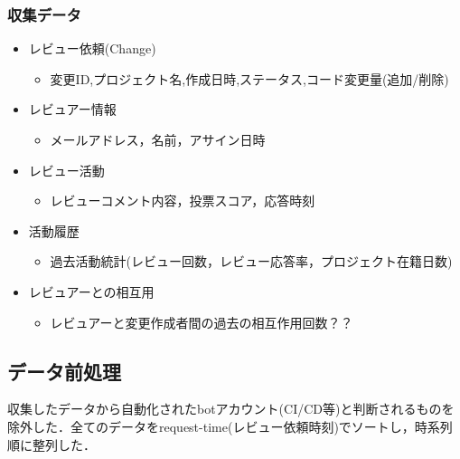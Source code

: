 \documentclass[submit,techrep,noauthor]{ipsj}
\begin{document}
\subsubsection{収集データ}
\begin{itemize}
    \item レビュー依頼(Change)
    \begin{itemize}
        \item 変更ID,プロジェクト名,作成日時,ステータス,コード変更量(追加/削除)
    \end{itemize}
\end{itemize}
\begin{itemize}
    \item レビュアー情報
    \begin{itemize}
        \item メールアドレス，名前，アサイン日時
    \end{itemize}
\end{itemize}
\begin{itemize}
    \item レビュー活動
    \begin{itemize}
        \item  レビューコメント内容，投票スコア，応答時刻
    \end{itemize}
\end{itemize}

\begin{itemize}
    \item 活動履歴
    \begin{itemize}
        \item  過去活動統計(レビュー回数，レビュー応答率，プロジェクト在籍日数)
    \end{itemize}
\end{itemize}
\begin{itemize}
    \item レビュアーとの相互用
    \begin{itemize}
        \item レビュアーと変更作成者間の過去の相互作用回数？？
    \end{itemize}
\end{itemize}

\subsection{データ前処理}
収集したデータから自動化されたbotアカウント(CI/CD等)と判断されるものを除外した．全てのデータをrequest-time(レビュー依頼時刻)でソートし，時系列順に整列した．
\end{document}
